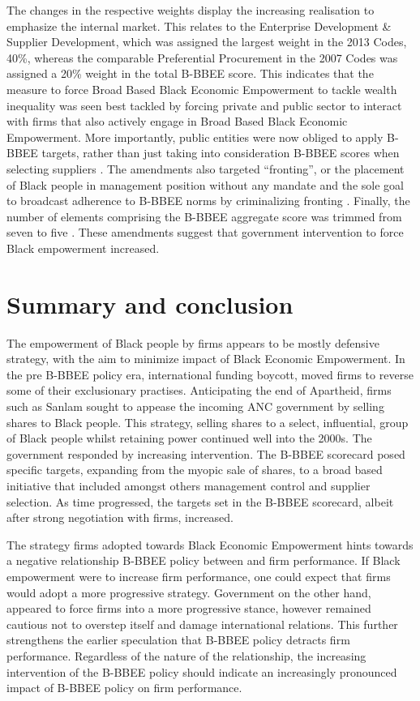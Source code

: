 The changes in the respective weights display the increasing realisation to emphasize the internal market. This relates to the Enterprise Development & Supplier Development, which was assigned the largest weight in the 2013 Codes, 40\%, whereas the comparable Preferential Procurement in the 2007 Codes was assigned a 20\% weight in the total B-BBEE score. This indicates that the measure to force Broad Based Black Economic Empowerment to tackle wealth inequality was seen best tackled by forcing private and public sector to interact with firms that also actively engage in Broad Based Black Economic Empowerment. More importantly, public entities were now obliged to apply B-BBEE targets, rather than just taking into consideration B-BBEE scores when selecting suppliers \cite[p36]{N4}. The amendments also targeted “fronting”, or the placement of Black people in management position without any mandate and the sole goal to broadcast adherence to B-BBEE norms by criminalizing fronting \cite[p36]{N4}. Finally, the number of elements comprising the B-BBEE aggregate score was trimmed from seven to five \cite[p8,p15]{N36}. These amendments suggest that government intervention to force Black empowerment increased.
\section{Summary and conclusion}
The empowerment of Black people by firms appears to be mostly defensive strategy, with the aim to minimize impact of Black Economic Empowerment. In the pre B-BBEE policy era, international funding boycott, moved firms to reverse some of their exclusionary practises. Anticipating the end of Apartheid, firms such as Sanlam sought to appease the incoming ANC government by selling shares to Black people. This strategy, selling shares to a select, influential, group of Black people whilst retaining power continued well into the 2000s. The government responded by increasing intervention. The B-BBEE scorecard posed specific targets, expanding from the myopic sale of shares, to a broad based initiative that included amongst others  management control and supplier selection. As time progressed, the targets set in the B-BBEE scorecard, albeit after strong negotiation with firms, increased.

The strategy firms adopted towards Black Economic Empowerment hints towards a negative relationship B-BBEE policy between and firm performance. If Black empowerment were to increase firm performance, one could expect that firms would adopt a more progressive strategy. Government on the other hand, appeared to force firms into a more progressive stance, however remained cautious not to overstep itself and damage international relations. This further strengthens the earlier speculation that B-BBEE policy detracts firm performance. Regardless of the nature of the relationship, the increasing intervention of the B-BBEE policy should indicate an increasingly pronounced impact of B-BBEE policy on firm performance.
